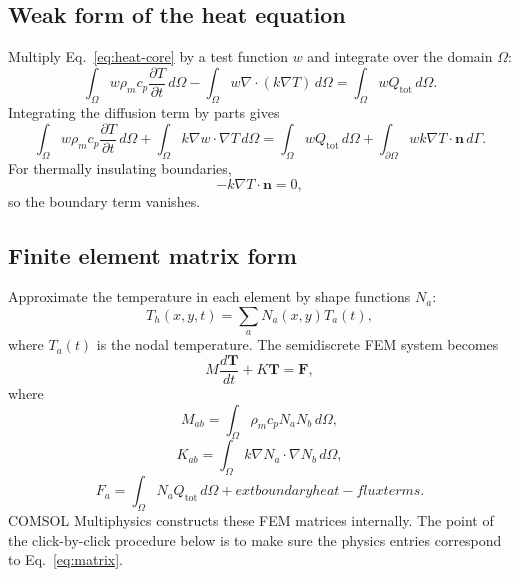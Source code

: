 \documentclass[11pt]{article}
\newcommand{\COMSOL}{COMSOL Multiphysics}
\newcommand{\comsol}{\COMSOL}
\begin{document}
\subsection{Weak form of the heat equation}
Multiply Eq.~\eqref{eq:heat-core} by a test function \(w\) and integrate over the domain \(\Omega\):
\begin{equation}
\int_{\Omega} w\rho_m c_p \frac{\partial T}{\partial t}\,d\Omega
-
\int_{\Omega} w\nabla\cdot(k\nabla T)\,d\Omega
=
\int_{\Omega} wQ_{\mathrm{tot}}\,d\Omega.
\end{equation}
Integrating the diffusion term by parts gives
\begin{equation}
\int_{\Omega} w\rho_m c_p \frac{\partial T}{\partial t}\,d\Omega
+
\int_{\Omega} k\nabla w\cdot\nabla T\,d\Omega
=
\int_{\Omega} wQ_{\mathrm{tot}}\,d\Omega
+
\int_{\partial\Omega} w k\nabla T\cdot\mathbf{n}\,d\Gamma.
\label{eq:weak}
\end{equation}
For thermally insulating boundaries,
\begin{equation}
-k\nabla T\cdot\mathbf{n}=0,
\end{equation}
so the boundary term vanishes.

\subsection{Finite element matrix form}
Approximate the temperature in each element by shape functions \(N_a\):
\begin{equation}
T_h(x,y,t)=\sum_a N_a(x,y)T_a(t),
\end{equation}
where \(T_a(t)\) is the nodal temperature.  The semidiscrete FEM system becomes
\begin{equation}
M\frac{d\mathbf{T}}{dt}+K\mathbf{T}=\mathbf{F},
\label{eq:matrix}
\end{equation}
where
\begin{equation}
M_{ab}=\int_{\Omega}\rho_m c_p N_aN_b\,d\Omega,
\end{equation}
\begin{equation}
K_{ab}=\int_{\Omega}k\nabla N_a\cdot\nabla N_b\,d\Omega,
\end{equation}
\begin{equation}
F_a=\int_{\Omega}N_aQ_{\mathrm{tot}}\,d\Omega+	ext{boundary heat-flux terms}.
\end{equation}
\comsol{} constructs these FEM matrices internally.  The point of the click-by-click procedure below is to make sure the physics entries correspond to Eq.~\eqref{eq:matrix}.
\end{document}
